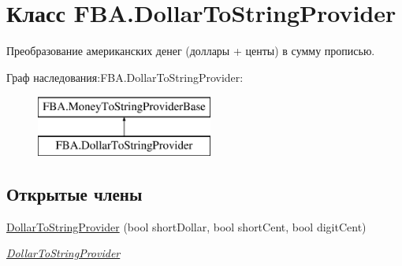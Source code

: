 \hypertarget{class_f_b_a_1_1_dollar_to_string_provider}{}\section{Класс F\+B\+A.\+Dollar\+To\+String\+Provider}
\label{class_f_b_a_1_1_dollar_to_string_provider}


Преобразование американских денег (доллары + центы) в сумму прописью.  


Граф наследования\+:F\+B\+A.\+Dollar\+To\+String\+Provider\+:\begin{figure}[H]
\begin{center}
\leavevmode
\includegraphics[height=2.000000cm]{class_f_b_a_1_1_dollar_to_string_provider}
\end{center}
\end{figure}
\subsection*{Открытые члены}
\begin{DoxyCompactItemize}
\item 
\mbox{\hyperlink{class_f_b_a_1_1_dollar_to_string_provider_a6e6ba007bbc128dab84b737f637bd726}{Dollar\+To\+String\+Provider}} (bool short\+Dollar, bool short\+Cent, bool digit\+Cent)
\begin{DoxyCompactList}\small\item\em \mbox{\hyperlink{class_f_b_a_1_1_dollar_to_string_provider}{Dollar\+To\+String\+Provider}} \end{DoxyCompactList}\end{DoxyCompactItemize}
